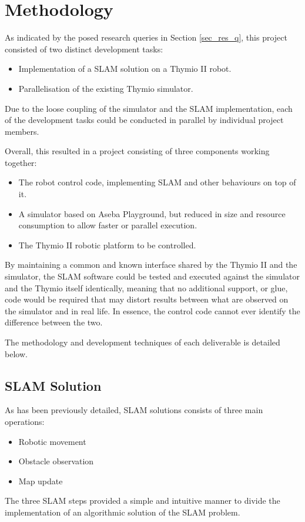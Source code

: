 \section{Methodology}
As indicated by the posed research queries in Section \ref{sec_res_q},
this project consisted of two distinct development tasks:

\begin{itemize}
\item Implementation of a SLAM solution on a Thymio II robot.
\item Parallelisation of the existing Thymio simulator.
\end{itemize}

Due to the loose coupling of the simulator and the SLAM implementation, each of
the development tasks could be conducted in parallel by individual project
members.

Overall, this resulted in a project consisting of three components working
together:
\begin{itemize}
    \item The robot control code, implementing SLAM and other behaviours
        on top of it.
    \item A simulator based on Aseba Playground, but reduced in size and
        resource consumption to allow faster or parallel execution.
    \item The Thymio II robotic platform to be controlled.
\end{itemize}
By maintaining a common and known interface shared by the Thymio II and the
simulator, the SLAM software could be tested and executed against the simulator
and the Thymio itself identically, meaning that no additional support, or glue,
code would be required that may distort results between what are observed on
the simulator and in real life. In essence, the control code cannot ever
identify the difference between the two.

The methodology and development techniques of each deliverable is detailed
below.

\subsection{SLAM Solution}\label{meth_slam}
As has been previously detailed, SLAM solutions consists of three main
operations:
\begin{itemize}
    \item Robotic movement
    \item Obstacle observation
    \item Map update
\end{itemize}
The three SLAM steps provided a simple and intuitive manner to divide the
implementation of an algorithmic solution of the SLAM problem.

